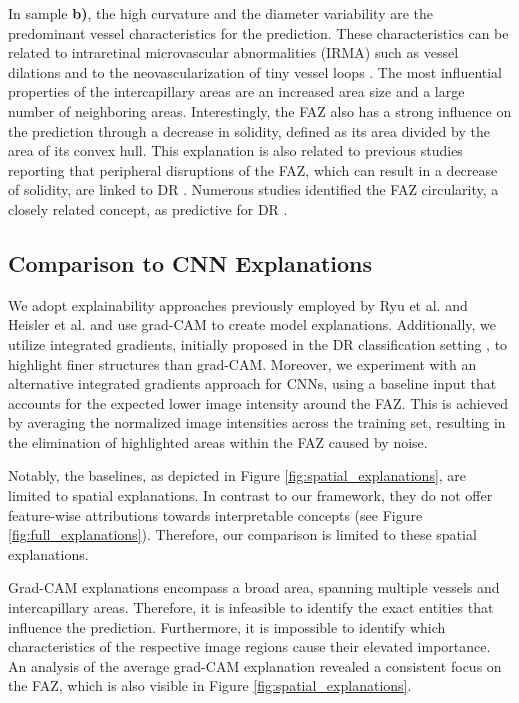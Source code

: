 In sample \textbf{b)}, the high curvature and the diameter variability are the predominant vessel characteristics for the prediction. These characteristics can be related to intraretinal microvascular abnormalities (IRMA) such as vessel dilations and to the neovascularization of tiny vessel loops \cite{ishibazawa2016characteristics}.
The most influential properties of the intercapillary areas are an increased area size and a large number of neighboring areas. Interestingly, the FAZ also has a strong influence on the prediction through a decrease in solidity, defined as its area divided by the area of its convex hull. This explanation is also related to previous studies reporting that peripheral disruptions of the FAZ, which can result in a decrease of solidity, are linked to DR \cite{fernandez2022retinal}. Numerous studies identified the FAZ circularity, a closely related concept, as predictive for DR \cite{sun2021optical}.

\subsection{Comparison to CNN Explanations}
We adopt explainability approaches previously employed by Ryu et al. \cite{ryu2021deep} and Heisler et al. \cite{heisler2020ensemble} and use grad-CAM to create model explanations. Additionally, we utilize integrated gradients, initially proposed in the DR classification setting \cite{sundararajan2017axiomatic}, to highlight finer structures than grad-CAM. Moreover, we experiment with an alternative integrated gradients approach for CNNs, using a baseline input that accounts for the expected lower image intensity around the FAZ. This is achieved by averaging the normalized image intensities across the training set, resulting in the elimination of highlighted areas within the FAZ caused by noise.

Notably, the baselines, as depicted in Figure \ref{fig:spatial_explanations}, are limited to spatial explanations. In contrast to our framework, they do not offer feature-wise attributions towards interpretable concepts (see Figure \ref{fig:full_explanations}). Therefore, our comparison is limited to these spatial explanations. 

Grad-CAM explanations encompass a broad area, spanning multiple vessels and intercapillary areas. Therefore, it is infeasible to identify the exact entities that influence the prediction. Furthermore, it is impossible to identify which characteristics of the respective image regions cause their elevated importance. An analysis of the average grad-CAM explanation revealed a consistent focus on the FAZ, which is also visible in Figure \ref{fig:spatial_explanations}. 

